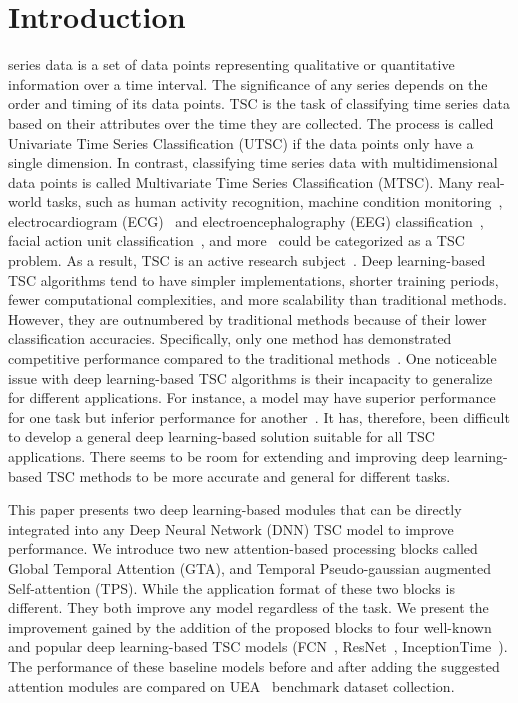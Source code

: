 \documentclass[journal]{IEEEtran}
\begin{document}
\IEEEpeerreviewmaketitle



\section{Introduction}
 series data is a set of data points representing qualitative or quantitative information over a time interval. The significance of any series depends on the order and timing of its data points. TSC is the task of classifying time series data based on their attributes over the time they are collected. The process is called Univariate Time Series Classification (UTSC) if the data points only have a single dimension. In contrast, classifying time series data with multidimensional data points is called Multivariate Time Series Classification (MTSC). Many real-world tasks, such as human activity recognition, machine condition monitoring~\cite{TJNN_tsc_mcm}, electrocardiogram (ECG)~\cite{TJNN_tsc_ecg} and electroencephalography (EEG) classification~\cite{TJNN_tsc_eeg}, facial action unit classification~\cite{TJNN_tsc_fac,sim}, and more~\cite{TJNN_tsc_cyc,bagnall2018uea} could be categorized as a TSC problem. As a result, TSC is an active research subject~\cite{bagnall2018uea}. Deep learning-based TSC algorithms tend to have simpler implementations, shorter training periods, fewer computational complexities, and more scalability than traditional methods. However, they are outnumbered by traditional methods because of their lower classification accuracies. Specifically, only one method has demonstrated competitive performance compared to the traditional methods~\cite{fawaz2020inceptiontime,2021hive}. One noticeable issue with deep learning-based TSC algorithms is their incapacity to generalize for different applications. For instance, a model may have superior performance for one task but inferior performance for another~\cite{rank1}. It has, therefore, been difficult to develop a general deep learning-based solution suitable for all TSC applications. There seems to be room for extending and improving deep learning-based TSC methods to be more accurate and general for different tasks.

This paper presents two deep learning-based modules that can be directly integrated into any Deep Neural Network (DNN) TSC model to improve performance. We introduce two new attention-based processing blocks called Global Temporal Attention (GTA), and Temporal Pseudo-gaussian augmented Self-attention (TPS). While the application format of these two blocks is different. They both improve any model regardless of the task. We present the improvement gained by the addition of the proposed blocks to four well-known and popular deep learning-based TSC models (FCN~\cite{wang2017time}, ResNet~\cite{wang2017time}, InceptionTime~\cite{fawaz2020inceptiontime}). The performance of these baseline models before and after adding the suggested attention modules are compared on UEA~\cite{bagnall2018uea} benchmark dataset collection.
\end{document}
